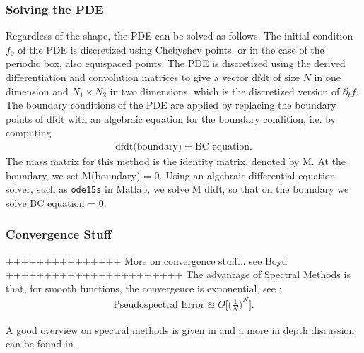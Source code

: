 \subsubsection{Solving the PDE}
Regardless of the shape, the PDE can be solved as follows.
The initial condition $f_0$ of the PDE is discretized using Chebyshev points, or in the case of the periodic box, also equispaced points. The PDE is discretized using the derived differentiation and convolution matrices to give a vector $\text{dfdt}$ of size $N$ in one dimension and $N_1\times N_2$ in two dimensions, which is the discretized version of $\partial_t f$. The boundary conditions of the PDE are applied by replacing the boundary points of $\text{dfdt}$ with an algebraic equation for the boundary condition, i.e. by computing 
\begin{align*}
	\text{dfdt} \text{(boundary)} = \text{BC equation}.
\end{align*}
The mass matrix for this method is the identity matrix, denoted by M. At the boundary, we set M(boundary) = 0. 
Using an algebraic-differential equation solver, such as \texttt{ode15s} in Matlab, we solve M $\text{dfdt}$, so that on the boundary we solve BC equation = 0.
\subsubsection{Convergence Stuff}
+++++++++++++++ More on convergence stuff... see Boyd +++++++++++++++++++++++
The advantage of Spectral Methods is that, for smooth functions, the convergence is exponential, see \cite{Boyd1}:
\begin{align*}
	\text{Pseudospectral Error} \approxeq O \bigg[ \bigg( \frac{1}{N} \bigg)^N \bigg].
\end{align*}


A good overview on spectral methods is given in \cite{bibTrefethen} and a more in depth discussion can be found in \cite{Boyd1}.

	
%	
%	
	
%